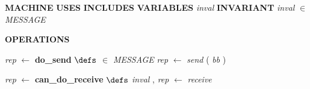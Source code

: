 %
\bsetindent
\begin{tabbing}
\bSetTabs
%
%
\bbnl
{\bf MACHINE} \bhsp{} \-\label{Sender}
%
%
\bbnl
{\bf USES} \label{Bool_TYPE}
%
%
\bbnl
{\bf INCLUDES} \label{SecureNetwork}
%
%
\bbnl
{\bf VARIABLES} \+ \bbnl
{\em inval\/}\label{inval}  \-
%
%
\bbnl
{\bf INVARIANT} \+ \bbnl
{\em inval\/} $\in$ {\em MESSAGE\/}\label{MESSAGE}
\end{tabbing}
\bresetindent
%
%
\vspace{-4.5ex}\bsetindent
\begin{tabbing}
\bSetTabs
\+\> \-
%
%
\bnl\bnl
{\bf OPERATIONS} \+ \bbnl

%
%
{\em rep\/} $\longleftarrow$  {\bf { do\_send}}  \bhsp $\defs$ \+ \bnl
  \+\bnl
{}  \-\bnl
{}  $\in$ {\em MESSAGE\/}\label{MESSAGE}  \-\bnl
{} \+\bnl
{\em rep\/} $\longleftarrow$ {\em send\/}\label{send}  ( {\em bb\/} )  \-\bnl
{}  \-\bnl
{}  \- \bOperationSemiColon 
\end{tabbing}
\bresetindent
%
%
\vspace{-4.5ex}\bsetindent
\begin{tabbing}
\bSetTabs
\+\>
%
%
{\em rep\/} $\longleftarrow$  {\bf { can\_do\_receive}}  \bhsp $\defs$ \+ \bnl
{\em inval\/} , {\em rep\/} $\longleftarrow$ {\em receive\/}\label{receive}  \-
\end{tabbing}
\bresetindent
%
